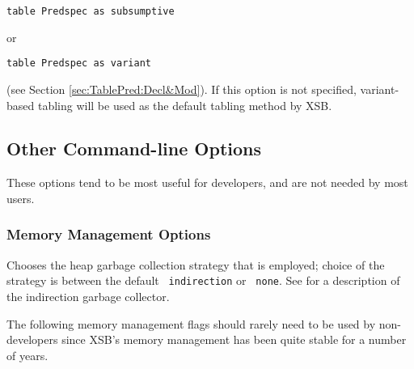 \begin{description}
  {\tt table Predspec as subsumptive}

or 

{\tt table Predspec as variant}
  
\noindent
  (see Section \ref{sec:TablePred:Decl&Mod}).  If this
  option is not specified, variant-based tabling will be used as the
  default tabling method by XSB\@.  
%
\end{description}
%
\subsection{Other Command-line Options}
%
These options tend to be most useful for developers, and are not needed by most users.

\subsubsection{Memory Management Options} \label{sec:memory-flags}

\begin{description}
\item[{\tt -g gc\_type}] Chooses the heap garbage collection strategy
  that is employed; choice of the strategy is between the default {\tt
    indirection}  or {\tt
    none}. See \cite{CaSC01} for a description of the indirection
  garbage collector.
\end{description}
%
The following memory management flags should rarely need to be used by
non-developers since XSB's memory management has been quite stable for
a number of years.

